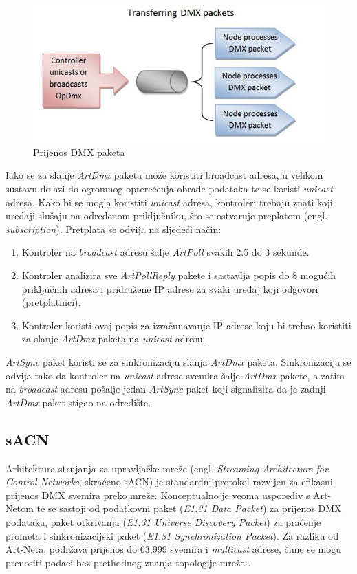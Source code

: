 \documentclass[times, utf8, zavrsni, numeric]{fer}
\begin{document}
\begin{figure}[htp]
	\centering
	\includegraphics[width=\linewidth]{slika 3-4.png}
	\caption{Prijenos DMX paketa \cite{streaming_packets}}
	\label{fig:slika 3-4}
\end{figure}

Iako se za slanje \emph{ArtDmx} paketa može koristiti broadcast adresa, u velikom sustavu dolazi do ogromnog opterećenja obrade podataka te se koristi \emph{unicast} adresa. Kako bi se mogla koristiti \emph{unicast} adresa, kontroleri trebaju znati  koji uređaji slušaju na određenom priključniku, što se ostvaruje preplatom (engl. \emph{subscription}). Pretplata se odvija na sljedeći način: \cite{subscription}

\begin{enumerate}
	\item Kontroler na \emph{broadcast} adresu šalje \emph{ArtPoll} svakih 2.5 do 3 sekunde.
	\item Kontroler analizira sve \emph{ArtPollReply} pakete i sastavlja popis do 8 mogućih priključnih adresa i pridružene IP adrese za svaki uređaj koji odgovori (pretplatnici).
	\item Kontroler koristi ovaj popis za izračunavanje IP adrese koju bi trebao koristiti za slanje \emph{ArtDmx} paketa na \emph{unicast} adresu.
\end{enumerate}

\emph{ArtSync} paket koristi se za sinkronizaciju slanja \emph{ArtDmx} paketa. Sinkronizacija se odvija tako da kontroler na \emph{unicast} adrese svemira šalje \emph{ArtDmx} pakete, a zatim na \emph{broadcast} adresu pošalje jedan \emph{ArtSync} paket koji signalizira da je zadnji \emph{ArtDmx} paket stigao na odredište.

\pagebreak

\subsection{sACN}
Arhitektura strujanja za upravljačke mreže (engl. \emph{Streaming Architecture for Control Networks}, skraćeno sACN) je standardni protokol razvijen za efikasni prijenos DMX svemira preko mreže. Konceptualno je veoma usporediv s Art-Netom te se sastoji od podatkovni paket (\emph{E1.31 Data Packet}) za prijenos DMX podataka, paket otkrivanja (\emph{E1.31 Universe Discovery Packet}) za praćenje prometa i sinkronizacijski paket (\emph{E1.31 Synchronization Packet}). Za razliku od Art-Neta, podržava prijenos do 63,999 svemira i \emph{multicast} adrese, čime se mogu prenositi podaci bez prethodnog znanja topologije mreže \cite{sACN}.
\end{document}
